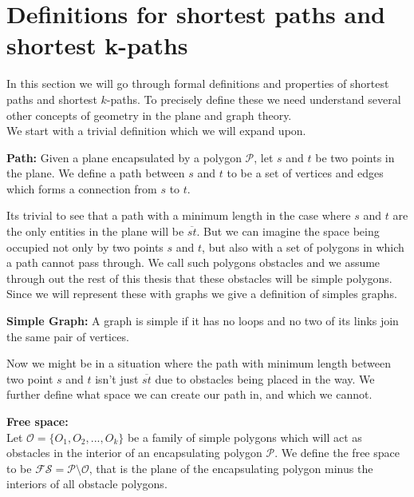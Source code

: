 \label{chapter:shortestpathmap}

\section{Definitions for shortest paths and shortest k-paths}

In this section we will go through formal definitions and properties of
shortest paths and shortest $k$-paths. To precisely define these we need
understand several other concepts of geometry in the plane and graph theory. \\

We start with a trivial definition which we will expand upon.

\begin{mydef}\textbf{Path:}
Given a plane encapsulated by a polygon $\mathcal{P}$, let $s$ and $t$ be two
	points in the plane. We define a path between $s$ and $t$ to be a set of
	vertices and edges which forms a connection from $s$ to $t$.
\end{mydef}

Its trivial to see that a path with a minimum length in the case where $s$ and $t$
are the only entities in the plane will be $\overline{st}$. But we can imagine the
space being occupied not only by two points $s$ and $t$, but also with a set of 
polygons in which a path cannot pass through. We call such polygons obstacles and
we assume through out the rest of this thesis that these obstacles will be 
simple polygons. Since we will represent these with graphs we give a definition of 
simples graphs.

\begin{mydef}\textbf{Simple Graph:}
  A graph is simple if it has no loops and no two of its links join the same pair
  of vertices.
\end{mydef}

Now we might be in a situation where the path with minimum length between two point 
$s$ and $t$ isn't just $\overline{st}$ due to obstacles being placed in the way. We 
further define what space we can create our path in, and which we cannot.

\begin{mydef} 
	\textbf{Free space:}\\ 
	Let $\mathcal{O}=\{O_1,O_2,...,O_k\}$ be a
	family of simple polygons which will act as obstacles in the interior of an
	encapsulating polygon $\mathcal{P}$. We define the free space to be
	$\mathcal{FS}=\mathcal{P}\setminus\mathcal{O}$, that is the plane of the
	encapsulating polygon minus the interiors of all obstacle polygons.
\end{mydef}

